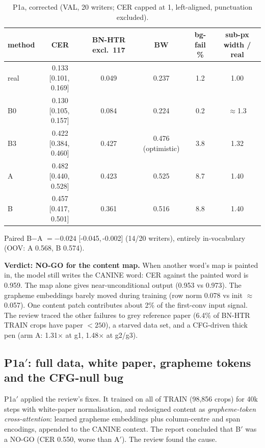 \documentclass[10.5pt,a4paper]{article}
\newcommand{\fp}[1]{\nolinkurl{#1}}
\newcommand{\src}[1]{\par\vspace{1pt}{\footnotesize\textcolor{gray}{Source:} #1\par}}
\newcommand{\Bp}{B$'$}
\newcommand{\Ap}{A$'$}
\newcommand{\ci}[2]{{\footnotesize[#1,\,#2]}}
\begin{document}
\begin{table}[H]
\centering
\caption{P1a, corrected (VAL, 20 writers; CER capped at 1, left-aligned, punctuation excluded).}
\label{tab:p1a}
\small
\begin{tabular}{@{}lccccc@{}}
\toprule
method & CER & BN-HTR excl.\ 117 & BW & bg-fail \% & sub-px width / real \\
\midrule
real & 0.133 \ci{0.101}{0.169} & 0.049 & 0.237 & 1.2 & 1.00 \\
B0 & 0.130 \ci{0.105}{0.157} & 0.084 & 0.224 & 0.2 & $\approx$1.3 \\
B3 & 0.422 \ci{0.384}{0.460} & 0.427 & 0.476 (optimistic) & 3.8 & 1.32 \\
A & 0.482 \ci{0.440}{0.528} & 0.423 & 0.525 & 8.7 & 1.40 \\
B & 0.457 \ci{0.417}{0.501} & 0.361 & 0.516 & 8.8 & 1.40 \\
\bottomrule
\end{tabular}
\par\smallskip\footnotesize Paired B$-$A $=-0.024$ \ci{-0.045}{-0.002} (14/20 writers), entirely in-vocabulary (OOV: A 0.568, B 0.574).
\src{\fp{scribe_wordgen/runs/P1a/REVIEW.md} \S1}
\end{table}

\textbf{Verdict: NO-GO for the content map.} When another word's map is painted in, the model still writes the CANINE word:
CER against the painted word is 0.959. The map alone gives near-unconditional output (0.953 vs 0.973). The grapheme
embeddings barely moved during training (row norm 0.078 vs init $\approx$0.057). One content patch contributes about 2\% of
the first-conv input signal. The review traced the other failures to grey reference paper (6.4\% of BN-HTR TRAIN crops have
paper $<250$), a starved data set, and a CFG-driven thick pen (arm A: 1.31$\times$ at g1, 1.48$\times$ at g2/g3).

\subsection{P1a$'$: full data, white paper, grapheme tokens and the CFG-null bug}
P1a$'$ applied the review's fixes. It trained on all of TRAIN (98,856 crops) for 40k steps with white-paper normalisation,
and redesigned content as \emph{grapheme-token cross-attention}: learned grapheme embeddings plus column-centre and span
encodings, appended to the CANINE context. The report concluded that \Bp{} was a NO-GO (CER 0.550, worse than \Ap). The
review found the cause.
\end{document}
